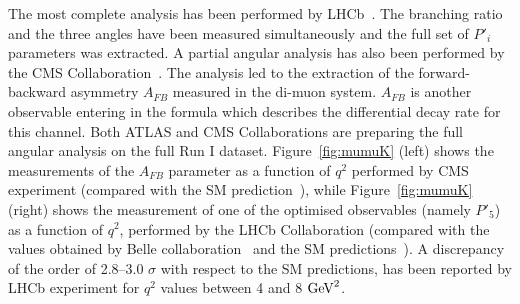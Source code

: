 The most complete analysis has been performed by LHCb~\cite{mumuK_LHCb}. The branching ratio and the three angles have been measured simultaneously and the full set of $P'_i$ parameters was extracted. A partial angular analysis has also been performed by the CMS Collaboration~\cite{mumuK_CMS}. The analysis led to the extraction of the forward-backward asymmetry $A_{FB}$  measured in the di-muon system. $A_{FB}$ is another observable entering in the formula which describes the differential decay rate for this channel. Both ATLAS and CMS Collaborations are preparing the full angular analysis on the full Run I dataset.  Figure~\ref{fig:mumuK} (left) shows the measurements of the $A_{FB}$ parameter as a function of $q^2$ performed by CMS experiment (compared with the SM prediction~\cite{ABSZ}), while Figure~\ref{fig:mumuK} (right) shows the measurement of one of the optimised observables (namely $P'_5$) as a function of $q^2$,  performed by the LHCb Collaboration (compared with the values obtained by Belle collaboration~\cite{Belle} and the SM predictions~\cite{DHMV}). A discrepancy of the order of 2.8--3.0 $\sigma$ with respect to the SM predictions, has been reported by LHCb experiment for $q^2$ values between 4 and 8 ${\rm{GeV}}^2$.

